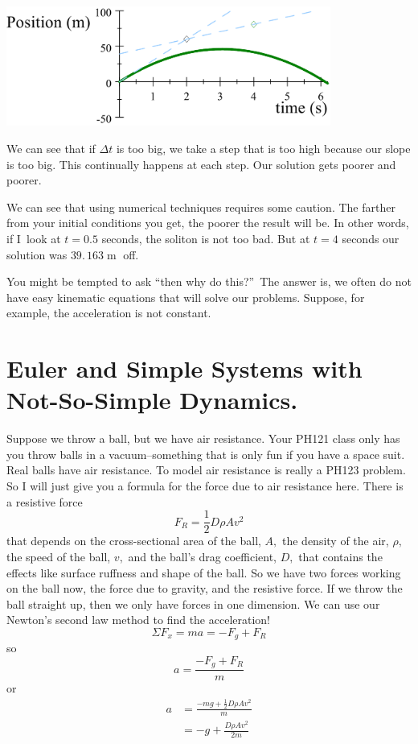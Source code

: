 \documentclass[twoside,11pt,ShortChapTitles]{BYUTextbook}
\begin{document}
\begin{center}
\includegraphics[width=0.8\textwidth]{Lab7_figs/PvTTwoPoints.png}
\end{center}


We can see that if $\Delta t$ is too big, we take a step that is too high
because our slope is too big. This continually happens at each step. Our
solution gets poorer and poorer.

We can see that using numerical techniques requires some caution. The farther
from your initial conditions you get, the poorer the result will be. In other
words, if I\ look at $t=0.5$ seconds, the soliton is not too bad. But at $t=4$
seconds our solution was $\allowbreak39.\,\allowbreak163 \operatorname{m} $ off.

You might be tempted to ask \textquotedblleft then why do
this?\textquotedblright\ The answer is, we often do not have easy kinematic
equations that will solve our problems. Suppose, for example, the acceleration
is not constant.

\section{Euler and Simple Systems with Not-So-Simple Dynamics.}

Suppose we throw a ball, but we have air resistance. Your PH121 class only has
you throw balls in a vacuum--something that is only fun if you have a space
suit. Real balls have air resistance. To model air resistance is really a
PH123 problem. So I will just give you a formula for the force due to air
resistance here. There is a resistive force
\[
F_{R}=\frac{1}{2}D\rho Av^{2}
\]
that depends on the cross-sectional area of the ball, $A,$ the density of the
air, $\rho,$ the speed of the ball, $v,$ and the ball's drag coefficient, $D,$
that contains the effects like surface ruffness and shape of the ball. So we
have two forces working on the ball now, the force due to gravity, and the
resistive force. If we throw the ball straight up, then we only have forces in
one dimension. We can use our Newton's second law method to find the acceleration! 
\[
\Sigma F_{x}=ma=-F_{g}+F_{R}
\]
so \[
a=\frac{-F_{g}+F_{R}}{m}
\]
or \begin{align*}
a  & =\frac{-mg+\frac{1}{2}D\rho Av^{2}}{m}\\
& =-g+\frac{D\rho Av^{2}}{2m} \end{align*}
\end{document}
